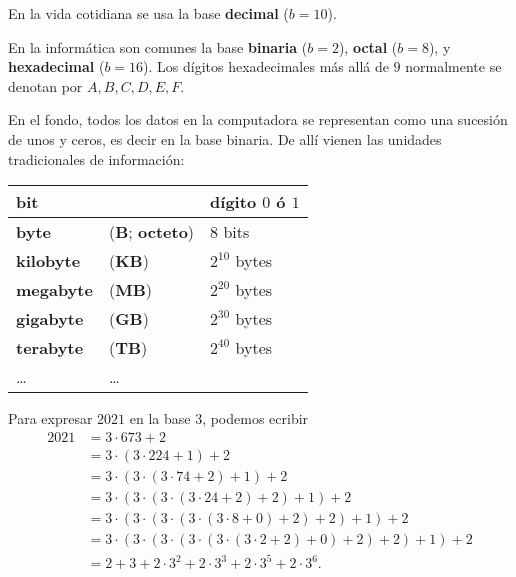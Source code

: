 \begin{comentario}
  En la vida cotidiana se usa la base \textbf{decimal} ($b = 10$).

  En la informática son comunes la base \textbf{binaria} ($b = 2$),
  \textbf{octal} ($b = 8$), y \textbf{hexadecimal} ($b = 16$). Los dígitos
  hexadecimales más allá de $9$ normalmente se denotan por $A,B,C,D,E,F$.

  En el fondo, todos los datos en la computadora se representan como una
  sucesión de unos y ceros, es decir en la base binaria. De allí vienen las
  unidades tradicionales de información:
  \pagebreak

  \begin{center}
    \renewcommand{\arraystretch}{1.5}
    \begin{tabular}{lll}
      \hline
      \textbf{bit} & & dígito $0$ ó $1$ \\
      \hline
      \textbf{byte} & (\textbf{B}; \textbf{octeto}) & $8$ bits \\
      \hline
      \textbf{kilobyte} & (\textbf{KB}) & $2^{10}$ bytes \\
      \hline
      \textbf{megabyte} & (\textbf{MB}) & $2^{20}$ bytes \\
      \hline
      \textbf{gigabyte} & (\textbf{GB}) & $2^{30}$ bytes \\
      \hline
      \textbf{terabyte} & (\textbf{TB}) & $2^{40}$ bytes \\
      \hline
      \dots & \dots
    \end{tabular}
  \end{center}
\end{comentario}

\begin{ejemplo}
  Para expresar $2021$ en la base $3$, podemos ecribir
  \begin{align*}
    2021 & = 3\cdot 673 + 2 \\
         & = 3\cdot (3\cdot 224 + 1) + 2 \\
         & = 3\cdot (3\cdot (3\cdot 74 + 2) + 1) + 2 \\
         & = 3\cdot (3\cdot (3\cdot (3\cdot 24 + 2) + 2) + 1) + 2 \\
         & = 3\cdot (3\cdot (3\cdot (3\cdot (3\cdot 8 + 0) + 2) + 2) + 1) + 2 \\
         & = 3\cdot (3\cdot (3\cdot (3\cdot (3\cdot (3\cdot \boxed{2} + \boxed{2}) + \boxed{0}) + \boxed{2}) + \boxed{2}) + \boxed{1}) + \boxed{2} \\
         & = 2 + 3 + 2\cdot 3^2 + 2\cdot 3^3 + 2\cdot 3^5 + 2\cdot 3^6.
  \end{align*}
\end{ejemplo}

